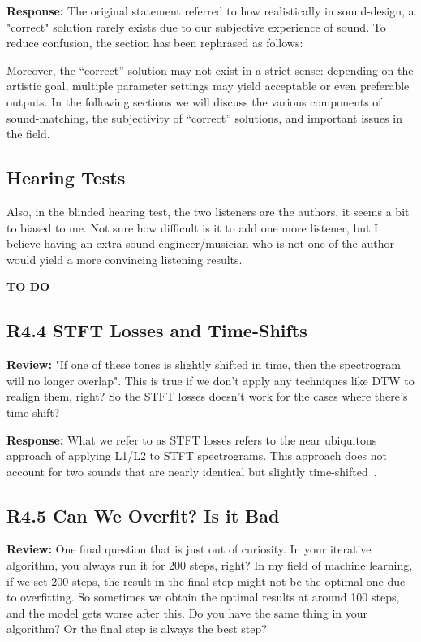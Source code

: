 \documentclass[11pt]{article}
\begin{document}
\noindent\textbf{Response:}
The original statement referred to how realistically in sound-design, a "correct" solution rarely exists due to our subjective experience of sound. To reduce confusion, the section has been rephrased as follows:
\begin{displayquote}
    Moreover, the ``correct'' solution may not exist in a strict sense: depending on the artistic goal, multiple parameter settings may yield acceptable or even preferable outputs.  In the following sections we will discuss the various components of sound-matching, the subjectivity of ``correct'' solutions, and important issues in the field.
\end{displayquote}

\subsection{Hearing Tests}
Also, in the blinded hearing test, the two listeners are the authors, it seems a bit to biased to me. Not sure how difficult is it to add one more listener, but I believe having an extra sound engineer/musician who is not one of the author would yield a more convincing listening results.
\\


\textbf{TO DO}

\subsection{\textbf{R4.4} STFT Losses and Time-Shifts}
\noindent\textbf{Review:}
"If one of these tones is slightly shifted in time, then the spectrogram will no longer overlap". This is true if we don't apply any techniques like DTW to realign them, right?
So the STFT losses doesn't work for the cases where there's time shift?

\noindent\textbf{Response:}
What we refer to as STFT losses refers to the near ubiquitous approach of applying L1/L2 to STFT spectrograms. This approach does not account for two sounds that are nearly identical but slightly time-shifted~\cite{vahidi2023mesostructures,turian2020sorry}.

\subsection{\textbf{R4.5} Can We Overfit? Is it Bad}
\noindent\textbf{Review:}
One final question that is just out of curiosity.
In your iterative algorithm, you always run it for 200 steps, right?
In my field of machine learning, if we set 200 steps, the result in the final step might not be the optimal one due to overfitting. So sometimes we obtain the optimal results at around 100 steps, and the model gets worse after this.
Do you have the same thing in your algorithm? Or the final step is always the best step?
\end{document}
